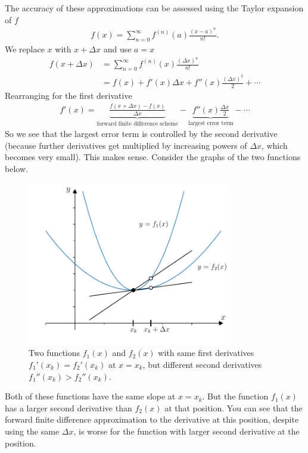 The accuracy of these approximations can be assessed using the Taylor expansion of $f$
\begin{align*}
f(x) = \sum_{n=0}^{\infty} f^{(n)}(a)\frac{\left(x-a\right)^n}{n!}.
\end{align*}
We replace $x$ with $x+\Delta x$ and use $a=x$
\begin{align*}
f(x+\Delta x) &= \sum_{n=0}^{\infty} f^{(n)}(x)\frac{\left(\Delta x\right)^n}{n!} \\
&= f(x) + f'(x) \Delta x + f''(x) \frac{\left( \Delta x\right)^2}{2} + \cdots
\end{align*}
Rearranging for the first derivative
\begin{align*}
f'(x) = \underbrace{\frac{f(x+\Delta x) - f(x)}{\Delta x}}_{\text{forward finite difference scheme}} - \underbrace{f''(x) \frac{\Delta x}{2}}_\text{largest error term} - \cdots
\end{align*}
So we see that the largest error term is controlled by the second derivative (because further derivatives get multiplied by increasing powers of $\Delta x$, which becomes very small). This makes sense. Consider the graphs of the two functions below.
\begin{figure}[H]
	\begin{center}
	\includegraphics[width=0.8\textwidth]{figures/ch5_forward_difference_2nd_deriv.pdf} 
	  \caption{Two functions $f_1(x)$ and $f_2(x)$ with same first derivatives $f_1'(x_k)=f_2'(x_k)$ at $x=x_k$, but different second derivatives $f_1''(x_k)>f_2''(x_k)$.} \label{fig:ch5_forward_difference_2nd_deriv}
	\end{center}
\end{figure}
\noindent Both of these functions have the same slope at $x=x_k$. But the function $f_1(x)$ has a larger second derivative than $f_2(x)$ at that position. You can see that the forward finite difference approximation to the derivative at this position, despite using the same $\Delta x$, is worse for the function with larger second derivative at the position.

